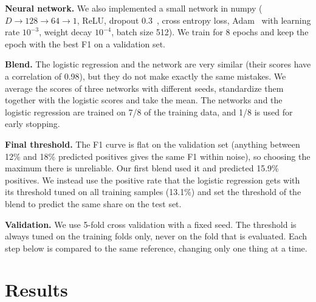\documentclass[10pt,conference,compsocconf]{IEEEtran}
\begin{document}
\textbf{Neural network.} We also implemented a small network in numpy ($D \to 128 \to 64 \to 1$, ReLU, dropout 0.3~\cite{dropout14}, cross entropy loss, Adam~\cite{adam15} with learning rate $10^{-3}$, weight decay $10^{-4}$, batch size 512). We train for 8 epochs and keep the epoch with the best F1 on a validation set.

\textbf{Blend.} The logistic regression and the network are very similar (their scores have a correlation of 0.98), but they do not make exactly the same mistakes. We average the scores of three networks with different seeds, standardize them together with the logistic scores and take the mean. The networks and the logistic regression are trained on 7/8 of the training data, and 1/8 is used for early stopping.

\textbf{Final threshold.} The F1 curve is flat on the validation set (anything between 12\% and 18\% predicted positives gives the same F1 within noise), so choosing the maximum there is unreliable. Our first blend used it and predicted 15.9\% positives. We instead use the positive rate that the logistic regression gets with its threshold tuned on all training samples (13.1\%) and set the threshold of the blend to predict the same share on the test set.

\textbf{Validation.} We use 5-fold cross validation with a fixed seed. The threshold is always tuned on the training folds only, never on the fold that is evaluated. Each step below is compared to the same reference, changing only one thing at a time.

\section{Results}
\label{sec:results}
\end{document}
